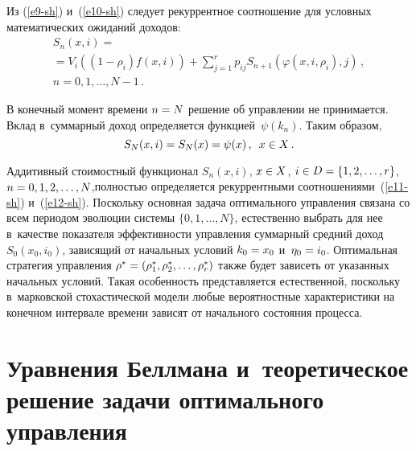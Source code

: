 \begin{multicols}{2}
     Из (\ref{e9-sh}) и~(\ref{e10-sh}) следует рекуррентное соотношение для 
условных математических ожиданий доходов:
     \begin{multline}
     S_n(x,i)={}\\
     {}=V_i\left( (1-\rho_i)f(x,i)\right)+\sum\limits^r_{j=1} p_{ij} S_{n+1} \left( 
\varphi\left(x,i,\rho_i\right),j\right)\,,\\
     n=0,1,\ldots , N-1\,.
     \label{e11-sh}
     \end{multline}
     
     В конечный момент времени $n\hm=N$ решение об управлении не 
принимается. Вклад в~суммарный доход определяется функцией~$\psi(k_n)$. 
Таким образом,
     \begin{equation}
     S_N(x,i)=S_N(x)=\psi(x)\,,\enskip x\in X\,.
     \label{e12-sh}
     \end{equation}
     
     Аддитивный стоимостный функционал $S_n(x,i)$, $x\hm\in X$, $i\hm\in D\hm= 
\{1,2,\ldots , r\}$, $n\hm=0,1,2,\ldots , N$,\linebreak пол\-ностью определяется рекуррентными 
соотношениями~(\ref{e11-sh}) и~(\ref{e12-sh}). Поскольку основная задача 
оптимального управ\-ле\-ния связана 
со всем периодом эволюции сис\-те\-мы $\{0,1,\ldots , N\}$, естественно выбрать для нее
в~качестве показателя эф\-фек\-тив\-ности управ\-ле\-ния суммарный средний 
\mbox{доход}~$S_0(x_0,i_0)$, за\-ви\-ся\-щий от начальных условий $k_0\hm= x_0$ 
и~$\eta_0\hm= i_0$. Оптимальная стратегия управ\-ле\-ния $\rho^*\hm= \left( \rho_1^*, 
\rho_2^*, \ldots , \rho^*_r\right)$ также будет зависеть от указанных начальных 
условий. Такая осо\-бен\-ность представляется естественной, поскольку 
в~марковской стохастической модели любые вероятностные характеристики на 
конечном интервале времени зависят от начального со\-сто\-яния про\-цесса.


\section{Уравнения Беллмана и~теоретическое решение задачи 
оптимального управления}


\end{multicols}
